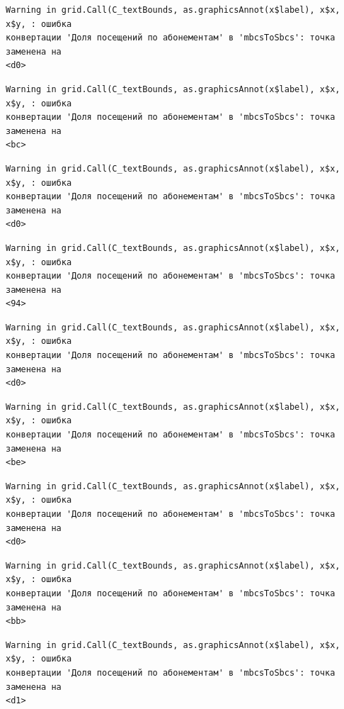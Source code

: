 \documentclass[
  letterpaper,
  DIV=11,
  numbers=noendperiod]{scrreprt}
\begin{document}
\begin{verbatim}
Warning in grid.Call(C_textBounds, as.graphicsAnnot(x$label), x$x, x$y, : ошибка
конвертации 'Доля посещений по абонементам' в 'mbcsToSbcs': точка заменена на
<d0>
\end{verbatim}

\begin{verbatim}
Warning in grid.Call(C_textBounds, as.graphicsAnnot(x$label), x$x, x$y, : ошибка
конвертации 'Доля посещений по абонементам' в 'mbcsToSbcs': точка заменена на
<bc>
\end{verbatim}

\begin{verbatim}
Warning in grid.Call(C_textBounds, as.graphicsAnnot(x$label), x$x, x$y, : ошибка
конвертации 'Доля посещений по абонементам' в 'mbcsToSbcs': точка заменена на
<d0>
\end{verbatim}

\begin{verbatim}
Warning in grid.Call(C_textBounds, as.graphicsAnnot(x$label), x$x, x$y, : ошибка
конвертации 'Доля посещений по абонементам' в 'mbcsToSbcs': точка заменена на
<94>
\end{verbatim}

\begin{verbatim}
Warning in grid.Call(C_textBounds, as.graphicsAnnot(x$label), x$x, x$y, : ошибка
конвертации 'Доля посещений по абонементам' в 'mbcsToSbcs': точка заменена на
<d0>
\end{verbatim}

\begin{verbatim}
Warning in grid.Call(C_textBounds, as.graphicsAnnot(x$label), x$x, x$y, : ошибка
конвертации 'Доля посещений по абонементам' в 'mbcsToSbcs': точка заменена на
<be>
\end{verbatim}

\begin{verbatim}
Warning in grid.Call(C_textBounds, as.graphicsAnnot(x$label), x$x, x$y, : ошибка
конвертации 'Доля посещений по абонементам' в 'mbcsToSbcs': точка заменена на
<d0>
\end{verbatim}

\begin{verbatim}
Warning in grid.Call(C_textBounds, as.graphicsAnnot(x$label), x$x, x$y, : ошибка
конвертации 'Доля посещений по абонементам' в 'mbcsToSbcs': точка заменена на
<bb>
\end{verbatim}

\begin{verbatim}
Warning in grid.Call(C_textBounds, as.graphicsAnnot(x$label), x$x, x$y, : ошибка
конвертации 'Доля посещений по абонементам' в 'mbcsToSbcs': точка заменена на
<d1>
\end{verbatim}
\end{document}
